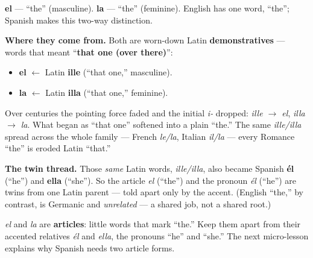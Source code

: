 \begin{cousinweb}
\textbf{el} — \textquotedblleft{}the\textquotedblright{} (masculine). \textbf{la} — \textquotedblleft{}the\textquotedblright{} (feminine). English has one word, \textquotedblleft{}the\textquotedblright{}; Spanish makes this two-way distinction.

\textbf{Where they come from.} Both are worn-down Latin \textbf{demonstratives} — words that meant \textquotedblleft{}\textbf{that one (over there)}\textquotedblright{}:

\begin{itemize}
\raggedright
  \item \textbf{el} $\leftarrow$ Latin \textbf{ille} (\textquotedblleft{}that one,\textquotedblright{} masculine).
  \item \textbf{la} $\leftarrow$ Latin \textbf{illa} (\textquotedblleft{}that one,\textquotedblright{} feminine).
\end{itemize}

Over centuries the pointing force faded and the initial \emph{i-} dropped: \emph{ille $\to$ el}, \emph{illa $\to$ la}. What began as \textquotedblleft{}that one\textquotedblright{} softened into a plain \textquotedblleft{}the.\textquotedblright{} The same \emph{ille/illa} spread across the whole family — French \emph{le/la}, Italian \emph{il/la} — every Romance \textquotedblleft{}the\textquotedblright{} is eroded Latin \textquotedblleft{}that.\textquotedblright{}

\textbf{The twin thread.} Those \emph{same} Latin words, \emph{ille/illa}, also became Spanish \textbf{él} (\textquotedblleft{}he\textquotedblright{}) and \textbf{ella} (\textquotedblleft{}she\textquotedblright{}). So the article \emph{el} (\textquotedblleft{}the\textquotedblright{}) and the pronoun \emph{él} (\textquotedblleft{}he\textquotedblright{}) are twins from one Latin parent — told apart only by the accent. (English \textquotedblleft{}the,\textquotedblright{} by contrast, is Germanic and \emph{unrelated} — a shared job, not a shared root.)
\end{cousinweb}

\begin{grammarlens}[title={What you've built}]
\emph{el} and \emph{la} are \textbf{articles}: little words that mark \textquotedblleft{}the.\textquotedblright{} Keep them apart from their accented relatives \emph{él} and \emph{ella}, the pronouns \textquotedblleft{}he\textquotedblright{} and \textquotedblleft{}she.\textquotedblright{} The next micro-lesson explains why Spanish needs two article forms.
\end{grammarlens}

